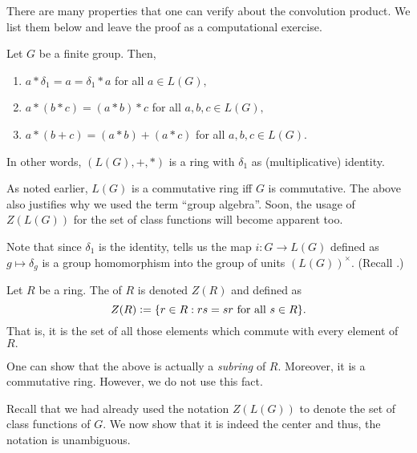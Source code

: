 There are many properties that one can verify about the convolution product. We list them below and leave the proof as a computational exercise.

\begin{prop}
    Let $G$ be a finite group. Then,
    \begin{enumerate}
        \item $a * \delta_1 = a = \delta_1 * a$ for all $a \in L(G),$
        \item $a * (b * c) = (a * b) * c$ for all $a, b, c \in L(G),$
        \item $a * (b + c) = (a * b) + (a * c)$ for all $a, b, c \in L(G).$
    \end{enumerate}
    In other words, $(L(G), +, *)$ is a ring with $\delta_1$ as (multiplicative) identity.
\end{prop}

As noted earlier, $L(G)$ is a commutative ring iff $G$ is commutative. The above also justifies why we used the term ``group algebra''. Soon, the usage of $Z(L(G))$ for the set of class functions will become apparent too.

\begin{rem}
    Note that since $\delta_1$ is the identity,  tells us the map $i : G \to L(G)$ defined as $g \mapsto \delta_g$ is a group homomorphism into the group of units $(L(G))^\times.$ (Recall .)
\end{rem}

\begin{defn}
    Let $R$ be a ring. The  of $R$ is denoted $Z(R)$ and defined as
    \begin{equation*}
        Z(R) \vcentcolon= \{r \in R : rs = sr \text{ for all } s \in R\}.
    \end{equation*}
    That is, it is the set of all those elements which commute with every element of $R.$
\end{defn}

\begin{rem}
    One can show that the above is actually a \emph{subring} of $R.$ Moreover, it is a commutative ring. However, we do not use this fact.
\end{rem}

Recall that we had already used the notation $Z(L(G))$ to denote the set of class functions of $G.$ We now show that it is indeed the center and thus, the notation is unambiguous.

